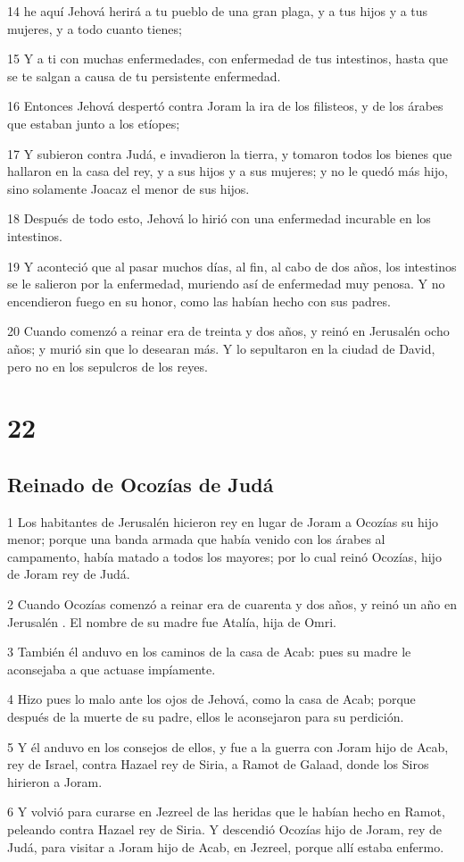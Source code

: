 \par 14 he aquí Jehová herirá a tu pueblo de una gran plaga, y a tus hijos y a tus mujeres, y a todo cuanto tienes;
\par 15 Y a ti con muchas enfermedades, con enfermedad de tus intestinos, hasta que se te salgan a causa de tu persistente enfermedad.
\par 16 Entonces Jehová despertó contra Joram la ira de los filisteos, y de los árabes que estaban junto a los etíopes;
\par 17 Y subieron contra Judá, e invadieron la tierra, y tomaron todos los bienes que hallaron en la casa del rey, y a sus hijos y a sus mujeres; y no le quedó más hijo, sino solamente Joacaz el menor de sus hijos.
\par 18 Después de todo esto, Jehová lo hirió con una enfermedad incurable en los intestinos.
\par 19 Y aconteció que al pasar muchos días, al fin, al cabo de dos años, los intestinos se le salieron por la enfermedad, muriendo así de enfermedad muy penosa. Y no encendieron fuego en su honor, como las habían hecho con sus padres.
\par 20 Cuando comenzó a reinar era de treinta y dos años, y reinó en Jerusalén  ocho años; y murió sin que lo desearan más. Y lo sepultaron en la ciudad de David, pero no en los sepulcros de los reyes.

\chapter{22}

\section*{Reinado de Ocozías de Judá}

\par 1 Los habitantes de Jerusalén  hicieron rey en lugar de Joram a Ocozías su hijo menor; porque una banda armada que  había venido con los árabes al campamento, había matado a todos los mayores; por lo cual reinó Ocozías, hijo de Joram rey de Judá.
\par 2 Cuando Ocozías comenzó a reinar era de cuarenta y dos años, y reinó un año en Jerusalén . El nombre de su madre fue Atalía, hija de Omri.
\par 3 También él anduvo en los caminos de la casa de Acab: pues su madre le aconsejaba a que actuase impíamente.
\par 4 Hizo pues lo malo ante los ojos de Jehová, como la casa de Acab; porque después de la muerte de su padre, ellos le aconsejaron para su perdición.
\par 5 Y él anduvo en los consejos de ellos, y fue a la guerra con Joram hijo de Acab, rey de Israel, contra Hazael rey de Siria, a Ramot de Galaad, donde los Siros hirieron a Joram.
\par 6 Y volvió para curarse en Jezreel de las heridas que le habían hecho en Ramot, peleando contra Hazael rey de Siria. Y descendió Ocozías hijo de Joram, rey de Judá, para visitar a Joram hijo de Acab, en Jezreel, porque allí estaba enfermo.


